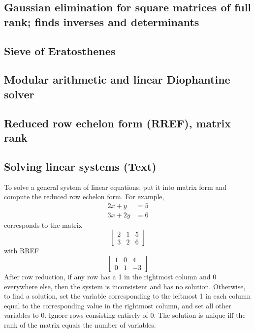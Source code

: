 \documentclass[9pt]{extarticle}
\begin{document}
\begin{multicols*}{3}
\subsection{Gaussian elimination for square matrices of full rank; finds
inverses and determinants} %


\subsection{Sieve of Eratosthenes} %


\subsection{Modular arithmetic and linear Diophantine solver} %


\subsection{Reduced row echelon form (RREF), matrix rank} %


\subsection{Solving linear systems (Text)} %
To solve a general system of linear equations, put it into matrix form and
compute the reduced row echelon form. For example,
\begin{align*}2x + y &= 5 \\ 3x + 2y &= 6\end{align*}
corresponds to the matrix
\[ \left[ \begin{array}{cc|c} 2 & 1 & 5 \\ 3 & 2 & 6 \end{array} \right] \]
with RREF
\[ \left[ \begin{array}{cc|c} 1 & 0 & 4 \\ 0 & 1 & -3 \end{array} \right] \]
After row reduction, if any row has a 1 in the rightmost column and 0
everywhere else, then the system is inconsistent and has no solution.
Otherwise, to find a solution, set the variable corresponding to the leftmost 1
in each column equal to the corresponding value in the rightmost column, and
set all other variables to 0. Ignore rows consisting entirely of 0. The
solution is unique iff the rank of the matrix equals the number of variables.


\end{multicols*}
\end{document}
